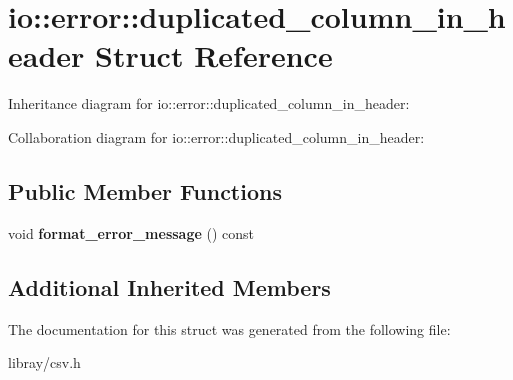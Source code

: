 \hypertarget{structio_1_1error_1_1duplicated__column__in__header}{}\section{io\+:\+:error\+:\+:duplicated\+\_\+column\+\_\+in\+\_\+header Struct Reference}
\label{structio_1_1error_1_1duplicated__column__in__header}


Inheritance diagram for io\+:\+:error\+:\+:duplicated\+\_\+column\+\_\+in\+\_\+header\+:


Collaboration diagram for io\+:\+:error\+:\+:duplicated\+\_\+column\+\_\+in\+\_\+header\+:
\subsection*{Public Member Functions}
\begin{DoxyCompactItemize}
\item 
\mbox{\label{structio_1_1error_1_1duplicated__column__in__header_a213825695d770d3ee2ee7bb9a2bfa818}} 
void {\bfseries format\+\_\+error\+\_\+message} () const
\end{DoxyCompactItemize}
\subsection*{Additional Inherited Members}


The documentation for this struct was generated from the following file\+:\begin{DoxyCompactItemize}
\item 
libray/csv.\+h\end{DoxyCompactItemize}
